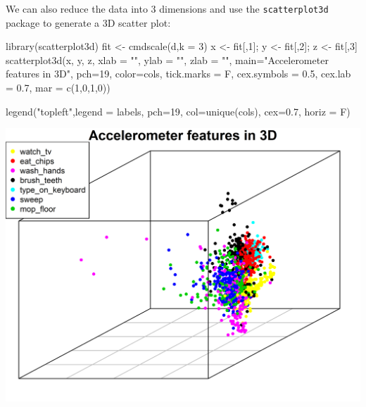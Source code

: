 \documentclass[
  11pt,
]{krantz}
\newenvironment{Shaded}{\begin{snugshade}}{\end{snugshade}}
\newcommand{\AttributeTok}[1]{\textcolor[rgb]{0.61,0.61,0.61}{#1}}
\newcommand{\DecValTok}[1]{\textcolor[rgb]{0.06,0.06,0.06}{#1}}
\newcommand{\FloatTok}[1]{\textcolor[rgb]{0.06,0.06,0.06}{#1}}
\newcommand{\FunctionTok}[1]{\textcolor[rgb]{0,0,0}{#1}}
\newcommand{\NormalTok}[1]{#1}
\newcommand{\OtherTok}[1]{\textcolor[rgb]{0.37,0.37,0.37}{#1}}
\newcommand{\StringTok}[1]{\textcolor[rgb]{0.5,0.5,0.5}{#1}}
\begin{document}
We can also reduce the data into \(3\) dimensions and use the \texttt{scatterplot3d} package to generate a \(3\)D scatter plot:

\begin{Shaded}
\begin{Highlighting}[]
\FunctionTok{library}\NormalTok{(scatterplot3d)}
\NormalTok{fit }\OtherTok{\textless{}{-}} \FunctionTok{cmdscale}\NormalTok{(d,}\AttributeTok{k =} \DecValTok{3}\NormalTok{)}
\NormalTok{x }\OtherTok{\textless{}{-}}\NormalTok{ fit[,}\DecValTok{1}\NormalTok{]; y }\OtherTok{\textless{}{-}}\NormalTok{ fit[,}\DecValTok{2}\NormalTok{]; z }\OtherTok{\textless{}{-}}\NormalTok{ fit[,}\DecValTok{3}\NormalTok{]}
\FunctionTok{scatterplot3d}\NormalTok{(x, y, z,}
              \AttributeTok{xlab =} \StringTok{""}\NormalTok{,}
              \AttributeTok{ylab =} \StringTok{""}\NormalTok{,}
              \AttributeTok{zlab =} \StringTok{""}\NormalTok{,}
              \AttributeTok{main=}\StringTok{"Accelerometer features in 3D"}\NormalTok{,}
              \AttributeTok{pch=}\DecValTok{19}\NormalTok{,}
              \AttributeTok{color=}\NormalTok{cols,}
              \AttributeTok{tick.marks =}\NormalTok{ F,}
              \AttributeTok{cex.symbols =} \FloatTok{0.5}\NormalTok{,}
              \AttributeTok{cex.lab =} \FloatTok{0.7}\NormalTok{,}
              \AttributeTok{mar =} \FunctionTok{c}\NormalTok{(}\DecValTok{1}\NormalTok{,}\DecValTok{0}\NormalTok{,}\DecValTok{1}\NormalTok{,}\DecValTok{0}\NormalTok{))}

\FunctionTok{legend}\NormalTok{(}\StringTok{"topleft"}\NormalTok{,}\AttributeTok{legend =}\NormalTok{ labels, }
       \AttributeTok{pch=}\DecValTok{19}\NormalTok{, }
       \AttributeTok{col=}\FunctionTok{unique}\NormalTok{(cols),}
       \AttributeTok{cex=}\FloatTok{0.7}\NormalTok{,}
       \AttributeTok{horiz =}\NormalTok{ F)}
\end{Highlighting}
\end{Shaded}

\begin{center}\includegraphics[width=0.9\linewidth]{images/mds3d} \end{center}
\end{document}
